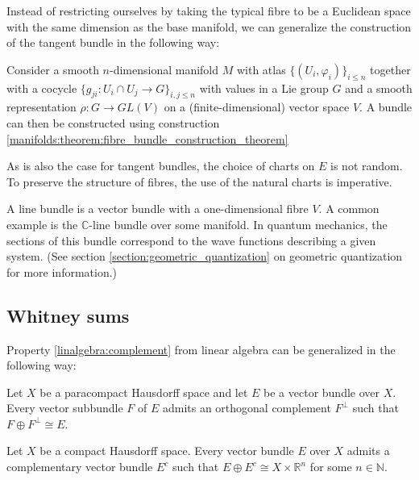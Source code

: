     Instead of restricting ourselves by taking the typical fibre to be a Euclidean space with the same dimension as the base manifold, we can generalize the construction of the tangent bundle in the following way:
    \begin{construct}\label{manifolds:vector_bundle_construction}
        Consider a smooth $n$-dimensional manifold $M$ with atlas $\{(U_i, \varphi_i)\}_{i\leq n}$ together with a cocycle $\{g_{ji}: U_i\cap U_j\rightarrow G\}_{i,j\leq n}$ with values in a Lie group $G$ and a smooth representation $\rho:G\rightarrow GL(V)$ on a (finite-dimensional) vector space $V$. A bundle can then be constructed using construction \ref{manifolds:theorem:fibre_bundle_construction_theorem}
    \end{construct}

    \begin{remark}
        As is also the case for tangent bundles, the choice of charts on $E$ is not random. To preserve the structure of fibres, the use of the natural charts is imperative.
    \end{remark}

    \begin{example}
        A line bundle is a vector bundle with a one-dimensional fibre $V$. A common example is the $\mathbb{C}$-line bundle over some manifold. In quantum mechanics, the sections of this bundle correspond to the wave functions describing a given system. (See section \ref{section:geometric_quantization} on geometric quantization for more information.)
    \end{example}

\subsection{Whitney sums}


    Property \ref{linalgebra:complement} from linear algebra can be generalized in the following way:
    \begin{property}
        Let $X$ be a paracompact Hausdorff space and let $E$ be a vector bundle over $X$. Every vector subbundle $F$ of $E$ admits an orthogonal complement $F^\perp$ such that $F\oplus F^\perp \cong E$.
    \end{property}
    \begin{property}\label{bundles:prop:hausdorff}
        Let $X$ be a compact Hausdorff space. Every vector bundle $E$ over $X$ admits a complementary vector bundle $E^c$ such that $E\oplus E^c \cong X\times\mathbb{R}^n$ for some $n\in\mathbb{N}$.
    \end{property}

